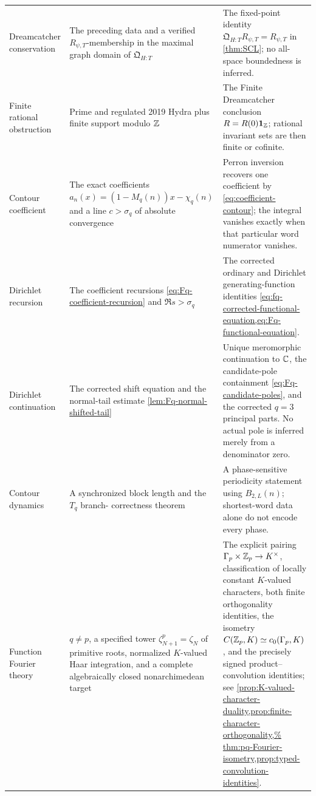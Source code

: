 \begin{longtable}{@{}p{}p{}p{}@{}}
Dreamcatcher conservation & The preceding data and a verified
$R_{\psi,T}$-membership in the maximal graph domain of
$\mathfrak Q_{H:T}$ & The fixed-point identity
$\mathfrak Q_{H:T}R_{\psi,T}=R_{\psi,T}$ in \cref{thm:SCL}; no all-space
boundedness is inferred.\\

Finite rational obstruction & Prime and regulated 2019 Hydra plus finite
support modulo $\mathbb Z$ & The Finite Dreamcatcher conclusion
$R=R(0)\mathbf 1_{\mathbb Z}$; rational invariant sets are then finite or cofinite.\\

Contour coefficient & The exact coefficients
$a_n(x)=(1-M_q(n))x-\chi_q(n)$ and a line
$c>\sigma_q$ of absolute convergence & Perron inversion recovers one
coefficient by \cref{eq:coefficient-contour}; the integral vanishes exactly
when that particular word numerator vanishes.\\

Dirichlet recursion & The coefficient recursions
\cref{eq:Fq-coefficient-recursion} and $\Re s>\sigma_q$ & The corrected
ordinary and Dirichlet generating-function identities
\cref{eq:fq-corrected-functional-equation,eq:Fq-functional-equation}.\\

Dirichlet continuation & The corrected shift equation and the normal-tail
estimate \cref{lem:Fq-normal-shifted-tail} & Unique meromorphic
continuation to $\mathbb C$, the candidate-pole containment
\cref{eq:Fq-candidate-poles}, and the corrected $q=3$ principal parts.
No actual pole is inferred merely from a denominator zero.\\

Contour dynamics & A synchronized block length and the $T_q$ branch-
correctness theorem & A phase-sensitive periodicity statement using
$B_{2,L}(n)$; shortest-word data alone do not encode every phase.\\

Function Fourier theory & $q\ne p$, a specified tower
$\zeta_{N+1}^p=\zeta_N$ of primitive roots, normalized $K$-valued Haar
integration, and a complete algebraically closed nonarchimedean target & The
explicit pairing $\Gamma_p\times\mathbb Z_p\to K^\times$, classification of locally
constant $K$-valued characters, both finite orthogonality identities, the
isometry $C(\mathbb Z_p,K)\simeq c_0(\Gamma_p,K)$, and the precisely signed
product--convolution identities; see
\cref{prop:K-valued-character-duality,prop:finite-character-orthogonality,%
thm:pq-Fourier-isometry,prop:typed-convolution-identities}.\\


\end{longtable}
